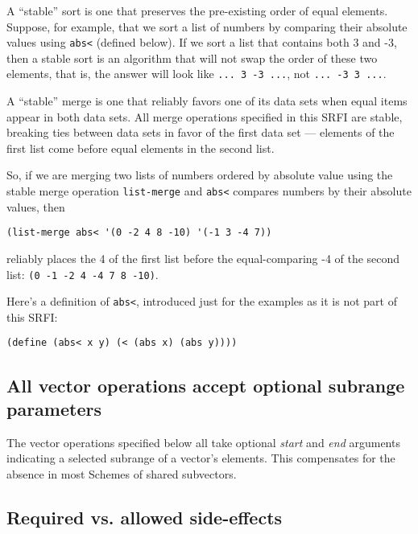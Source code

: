 A ``stable'' sort is one that preserves the pre-existing order of equal
elements. Suppose, for example, that we sort a list of numbers by
comparing their absolute values using \texttt{abs\textless{}} (defined
below). If we sort a list that contains both 3 and -3, then a stable
sort is an algorithm that will not swap the order of these two elements,
that is, the answer will look like \texttt{...\ 3\ -3\ ...}, not
\texttt{...\ -3\ 3\ ...}.

A ``stable'' merge is one that reliably favors one of its data sets when
equal items appear in both data sets. All merge operations specified in
this SRFI are stable, breaking ties between data sets in favor of the
first data set --- elements of the first list come before equal elements
in the second list.

So, if we are merging two lists of numbers ordered by absolute value
using the stable merge operation \texttt{list-merge} and
\texttt{abs\textless{}} compares numbers by their absolute values, then

\begin{verbatim}
(list-merge abs< '(0 -2 4 8 -10) '(-1 3 -4 7))
\end{verbatim}

reliably places the 4 of the first list before the equal-comparing -4 of
the second list: \texttt{(0\ -1\ -2\ 4\ -4\ 7\ 8\ -10)}.

Here's a definition of \texttt{abs\textless{}}, introduced just for the
examples as it is not part of this SRFI:

\begin{verbatim}
(define (abs< x y) (< (abs x) (abs y))))
\end{verbatim}

\subsection{All vector operations accept optional subrange
parameters}\label{Allvectoroperationsacceptoptionalsubrangeparameters}

The vector operations specified below all take optional \emph{start} and
\emph{end} arguments indicating a selected subrange of a vector's
elements. This compensates for the absence in most Schemes of shared
subvectors.

\subsection{Required vs. allowed
side-effects}\label{Requiredvs.allowedside-effects}


